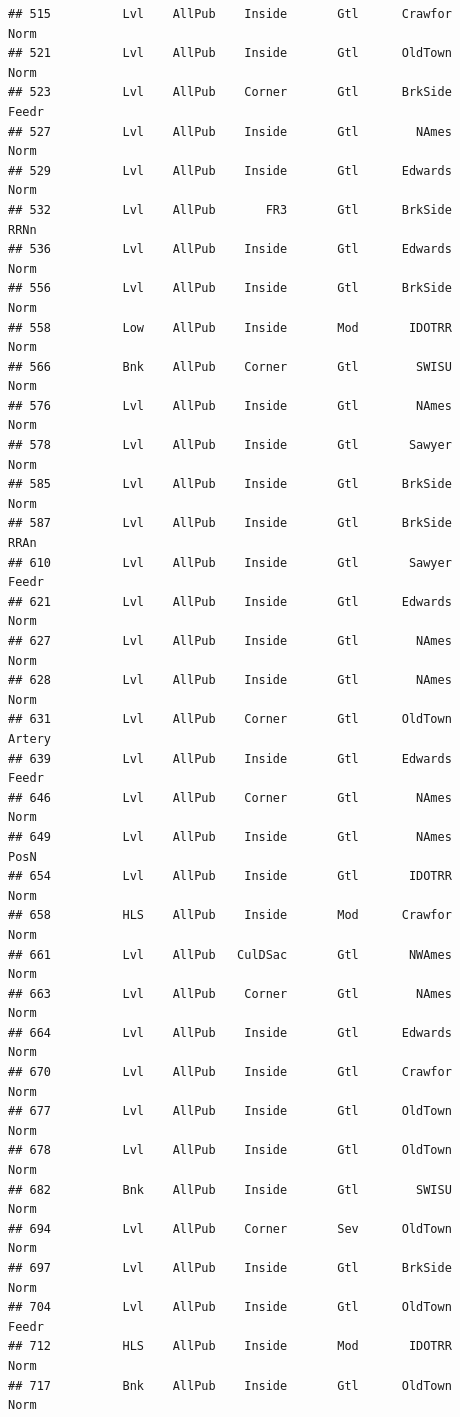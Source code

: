 \documentclass[]{article}
\begin{document}
\begin{verbatim}
## 515          Lvl    AllPub    Inside       Gtl      Crawfor       Norm
## 521          Lvl    AllPub    Inside       Gtl      OldTown       Norm
## 523          Lvl    AllPub    Corner       Gtl      BrkSide      Feedr
## 527          Lvl    AllPub    Inside       Gtl        NAmes       Norm
## 529          Lvl    AllPub    Inside       Gtl      Edwards       Norm
## 532          Lvl    AllPub       FR3       Gtl      BrkSide       RRNn
## 536          Lvl    AllPub    Inside       Gtl      Edwards       Norm
## 556          Lvl    AllPub    Inside       Gtl      BrkSide       Norm
## 558          Low    AllPub    Inside       Mod       IDOTRR       Norm
## 566          Bnk    AllPub    Corner       Gtl        SWISU       Norm
## 576          Lvl    AllPub    Inside       Gtl        NAmes       Norm
## 578          Lvl    AllPub    Inside       Gtl       Sawyer       Norm
## 585          Lvl    AllPub    Inside       Gtl      BrkSide       Norm
## 587          Lvl    AllPub    Inside       Gtl      BrkSide       RRAn
## 610          Lvl    AllPub    Inside       Gtl       Sawyer      Feedr
## 621          Lvl    AllPub    Inside       Gtl      Edwards       Norm
## 627          Lvl    AllPub    Inside       Gtl        NAmes       Norm
## 628          Lvl    AllPub    Inside       Gtl        NAmes       Norm
## 631          Lvl    AllPub    Corner       Gtl      OldTown     Artery
## 639          Lvl    AllPub    Inside       Gtl      Edwards      Feedr
## 646          Lvl    AllPub    Corner       Gtl        NAmes       Norm
## 649          Lvl    AllPub    Inside       Gtl        NAmes       PosN
## 654          Lvl    AllPub    Inside       Gtl       IDOTRR       Norm
## 658          HLS    AllPub    Inside       Mod      Crawfor       Norm
## 661          Lvl    AllPub   CulDSac       Gtl       NWAmes       Norm
## 663          Lvl    AllPub    Corner       Gtl        NAmes       Norm
## 664          Lvl    AllPub    Inside       Gtl      Edwards       Norm
## 670          Lvl    AllPub    Inside       Gtl      Crawfor       Norm
## 677          Lvl    AllPub    Inside       Gtl      OldTown       Norm
## 678          Lvl    AllPub    Inside       Gtl      OldTown       Norm
## 682          Bnk    AllPub    Inside       Gtl        SWISU       Norm
## 694          Lvl    AllPub    Corner       Sev      OldTown       Norm
## 697          Lvl    AllPub    Inside       Gtl      BrkSide       Norm
## 704          Lvl    AllPub    Inside       Gtl      OldTown      Feedr
## 712          HLS    AllPub    Inside       Mod       IDOTRR       Norm
## 717          Bnk    AllPub    Inside       Gtl      OldTown       Norm

\end{verbatim}
\end{document}
